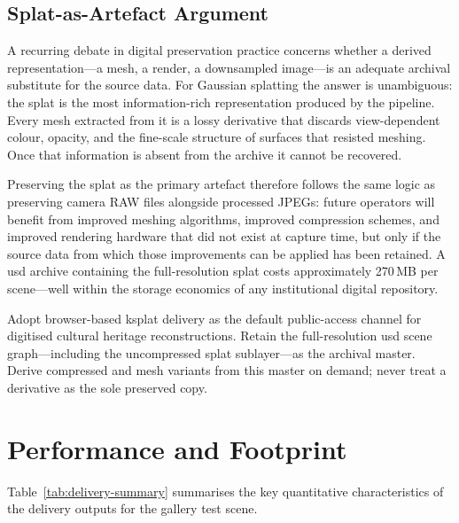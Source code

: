\subsection{Splat-as-Artefact Argument}

A recurring debate in digital preservation practice concerns whether a derived
representation---a mesh, a render, a downsampled image---is an adequate archival
substitute for the source data. For Gaussian splatting the answer is unambiguous:
the splat is the most information-rich representation produced by the pipeline.
Every mesh extracted from it is a lossy derivative that discards view-dependent
colour, opacity, and the fine-scale structure of surfaces that resisted meshing.
Once that information is absent from the archive it cannot be recovered.

Preserving the splat as the primary artefact therefore follows the same logic as
preserving camera RAW files alongside processed JPEGs: future operators will benefit
from improved meshing algorithms, improved compression schemes, and improved
rendering hardware that did not exist at capture time, but only if the source data
from which those improvements can be applied has been retained. A \acrshort{usd}
archive containing the full-resolution splat costs approximately 270\,MB per
scene---well within the storage economics of any institutional digital repository.

\begin{recommendation}
Adopt browser-based \acrshort{ksplat} delivery as the default public-access channel
for digitised cultural heritage reconstructions. Retain the full-resolution
\acrshort{usd} scene graph---including the uncompressed splat sublayer---as the
archival master. Derive compressed and mesh variants from this master on demand;
never treat a derivative as the sole preserved copy.
\end{recommendation}

\section{Performance and Footprint}
\label{sec:delivery-performance}

Table~\ref{tab:delivery-summary} summarises the key quantitative characteristics
of the delivery outputs for the gallery test scene.

